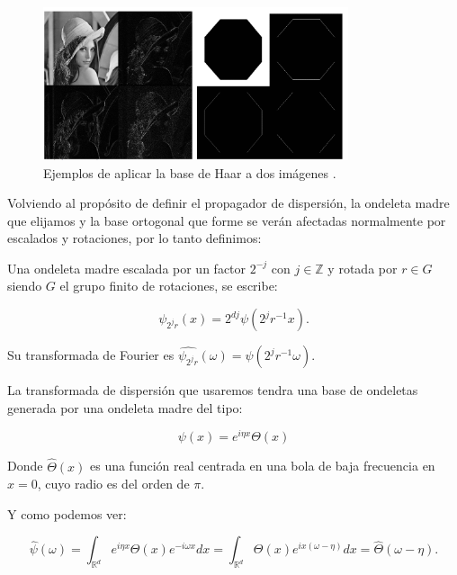 \begin{figure} [!h]
  \centering
  \includegraphics[width=0.8\textwidth]{img/ejemplos_haar_basis.png}
  \caption{Ejemplos de aplicar la base de Haar a dos imágenes \cite{HaarBasis}.}
  \label{fig:ejemplo_haar}
\end{figure}

\medskip 

\noindent Volviendo al propósito de definir el propagador de dispersión, la ondeleta madre que elijamos y la base ortogonal que forme se verán afectadas normalmente por escalados y rotaciones, por lo tanto definimos: 

\begin{definicion}
  Una ondeleta madre escalada por un factor $2^{-j}$ con $j \in \mathbb{Z}$ y rotada por $r \in G$ siendo $G$ el grupo finito de rotaciones, se escribe: 

  $$\psi_{2^j r}(x)=2^{dj} \psi(2^j r^{-1} x).$$
\end{definicion}


\medskip

\noindent Su transformada de Fourier es $\widehat{\psi_{2^j r}}(\omega)=\widehat{\psi}(2^j r^{-1} \omega)$.

\medskip

\noindent La transformada de dispersión que usaremos tendra una base de ondeletas generada por una ondeleta madre del tipo:

$$\psi(x)=e^{i\eta x} \Theta(x)$$

\noindent Donde $\widehat{\Theta}(x)$ es una función real centrada en una bola de baja frecuencia en $x=0$, cuyo radio es del orden de $\pi$.

\medskip

\noindent Y como podemos ver:

\begin{equation}
  \widehat{\psi}(\omega)=\int_{\mathbb{R}^d}e^{i \eta x} \Theta(x) e^{-i\omega x} dx=\int_{\mathbb{R}^d}\Theta(x) e^{ix(\omega-\eta)} dx=\widehat{\Theta}(\omega-\eta).
\end{equation}

